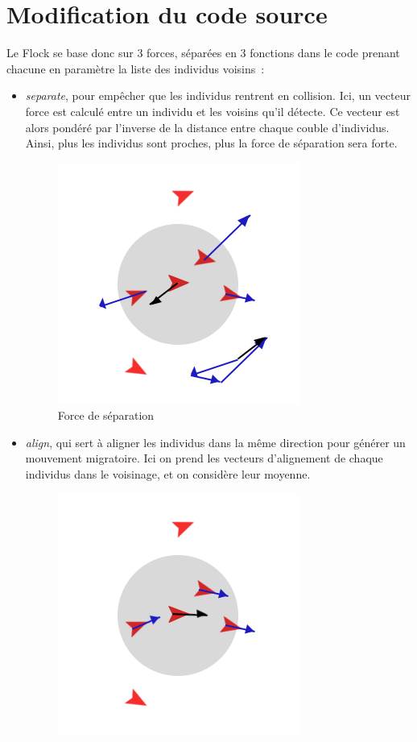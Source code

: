 \documentclass{article}
\begin{document}
\section{Modification du code source}

Le Flock se base donc sur 3 forces, séparées en 3 fonctions dans le code prenant chacune en paramètre la liste des individus voisins~:
\begin{itemize}
  \item \emph{separate}, pour empêcher que les individus rentrent en collision. Ici, un vecteur force est calculé entre un individu et les voisins qu'il détecte. Ce vecteur est alors pondéré par l'inverse de la distance entre chaque couble d'individus. Ainsi, plus les individus sont proches, plus la force de séparation sera forte.
  \begin{figure}[h]
  	\begin{center}
  		\includegraphics[scale=0.3]{img/separate}
  		\caption{Force de séparation}
  		\label{fig:separate}
  	\end{center}
  \end{figure}
  \item \emph{align}, qui sert à aligner les individus dans la même direction pour générer un mouvement migratoire. Ici on prend les vecteurs d'alignement de chaque individus dans le voisinage, et on considère leur moyenne.
  \begin{figure}[h]
  	\begin{center}
  		\includegraphics[scale=0.3]{img/align}

\end{center}
\end{figure}
\end{itemize}
\end{document}
